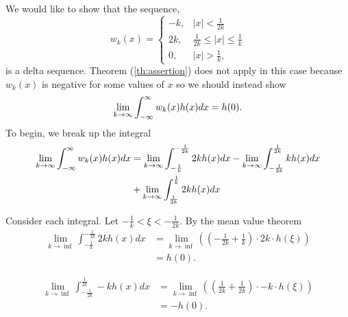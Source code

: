 \begin{example}
    We would like to show that the sequence,
    \begin{equation}
        w_k(x) = \begin{cases}
            -k, &|x|<\frac{1}{2k}\\
            2k, &\frac{1}{2k} \leq |x| \leq \frac{1}{k}\\
            0, &|x|> \frac{1}{k},
        \end{cases}
    \end{equation}
    is a delta sequence. Theorem (\ref{th:assertion}) does not apply in this case because \(w_k(x)\) is negative for some values of \(x\) so we should instead show 
    \begin{equation}
        \lim_{k\to \infty}\int_{-\infty}^{\infty} w_k(x) h(x) dx = h(0).
    \end{equation}
    To begin, we break up the integral 
    \begin{equation}
        \begin{split}
            \lim_{k\to \infty}\int_{-\infty}^{\infty} w_k(x) h(x) dx &= \lim_{k\to \infty}\int_{-\frac{1}{k}}^{-\frac{1}{2k}} 2kh(x)dx - \lim_{k\to \infty}\int_{-\frac{1}{2k}}^{\frac{1}{2k}} kh(x)dx \\
            &+ \lim_{k\to \infty}\int_{\frac{1}{2k}}^{\frac{1}{k}} 2kh(x)dx
        \end{split}
    \end{equation}
    
    Consider each integral. Let \(-\frac{1}{k}<\xi<-\frac{1}{2k}\). By the mean value theorem
    \begin{equation*}
        \begin{split}
            \lim_{k\to \inf}\int_{-\frac{1}{k}}^{-\frac{1}{2k}} 2kh(x)dx &= \lim_{k\to \inf}  \left( \left(-\frac{1}{2k} + \frac{1}{k}\right) 
            \cdot 2k\cdot h(\xi)\right) \\
            &=h(0).
        \end{split}
    \end{equation*}

    \begin{equation*}
        \begin{split}
            \lim_{k\to \inf}\int_{-\frac{1}{2k}}^{\frac{1}{2k}} -kh(x)dx &= \lim_{k\to \inf}  \left( \left(\frac{1}{2k} + \frac{1}{2k}\right) 
            \cdot -k\cdot h(\xi)\right) \\
            &=-h(0).
        \end{split}
    \end{equation*}


\end{example}
